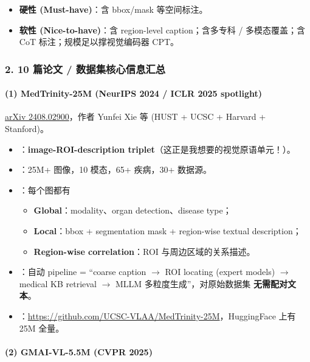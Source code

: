 \begin{itemize}[leftmargin=1.5em]
  \item \textbf{硬性 (Must-have)}：含 bbox/mask 等空间标注。
  \item \textbf{软性 (Nice-to-have)}：含 region-level caption；含多专科 / 多模态覆盖；含 CoT 标注；规模足以撑视觉编码器 CPT。
\end{itemize}

\subsubsection*{2. 10 篇论文 / 数据集核心信息汇总}

\paragraph{(1) MedTrinity-25M (NeurIPS 2024 / ICLR 2025 spotlight)}

\href{https://arxiv.org/abs/2408.02900}{arXiv 2408.02900}，作者 Yunfei Xie 等 (HUST + UCSC + Harvard + Stanford)。

\begin{itemize}[leftmargin=1.5em]
  \item {}：\textbf{image-ROI-description triplet}（这正是我想要的视觉原语单元！）。
  \item {}：25M+ 图像，10 模态，65+ 疾病，30+ 数据源。
  \item {}：每个图都有
  \begin{itemize}[leftmargin=1.5em]
    \item \textbf{Global}：modality、organ detection、disease type；
    \item \textbf{Local}：bbox + segmentation mask + region-wise textual description；
    \item \textbf{Region-wise correlation}：ROI 与周边区域的关系描述。
  \end{itemize}
  \item {}：自动 pipeline = ``coarse caption $\to$ ROI locating (expert models) $\to$ medical KB retrieval $\to$ MLLM 多粒度生成''，对原始数据集 \textbf{无需配对文本}。
  \item {}：\url{https://github.com/UCSC-VLAA/MedTrinity-25M}，HuggingFace 上有 25M 全量。
\end{itemize}

\paragraph{(2) GMAI-VL-5.5M (CVPR 2025)}

